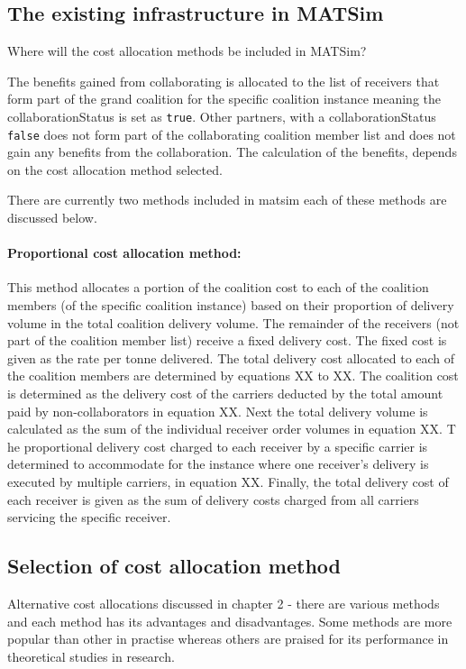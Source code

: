 \subsection{The existing infrastructure in MATSim}
Where will the cost allocation methods be included in MATSim?

The benefits gained from collaborating is allocated to the list of receivers that form part of the grand coalition for the specific coalition instance meaning the collaborationStatus is set as \texttt{true}. Other partners, with a collaborationStatus \texttt{false} does not form part of the collaborating coalition member list and does not gain any benefits from the collaboration. The calculation of the benefits, depends on the cost allocation method selected. 

There are currently two methods included in \acrshort{matsim} each of these methods are discussed below.
\paragraph{Proportional cost allocation method:} This method allocates a portion of the coalition cost to each of the coalition members (of the specific coalition instance) based on their proportion of delivery volume in the total coalition delivery volume. The remainder of the receivers (not part of the coalition member list) receive a fixed delivery cost. The fixed cost is given as the rate per tonne delivered. The total delivery cost allocated to each of the coalition members are determined by equations XX to XX. The coalition cost is determined as the delivery cost of the carriers deducted by the total amount paid by non-collaborators in equation XX.
Next the total delivery volume is calculated as the sum of the individual receiver order volumes in equation XX.
T he proportional delivery cost charged to each receiver by a specific carrier is determined to accommodate for the instance where one receiver's delivery is executed by multiple carriers, in equation XX. Finally, the total delivery cost of each receiver is given as the sum of delivery costs charged from all carriers servicing the specific receiver.\par


\subsection{Selection of cost allocation method}
Alternative cost allocations discussed in chapter 2 - there are various methods and each method has its advantages and disadvantages. Some methods are more popular than other in practise whereas others are praised for its performance in theoretical studies in research. 

